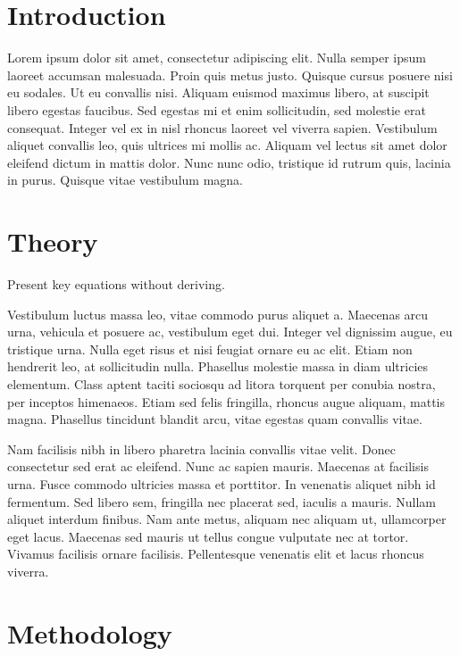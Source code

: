 \documentclass[a4paper,12pt,twocolumn]{article}
\begin{document}
\section{Introduction}
	Lorem ipsum dolor sit amet, consectetur adipiscing elit. Nulla semper ipsum laoreet accumsan malesuada. Proin quis metus justo. Quisque cursus posuere nisi eu sodales. Ut eu convallis nisi. Aliquam euismod maximus libero, at suscipit libero egestas faucibus. Sed egestas mi et enim sollicitudin, sed molestie erat consequat. Integer vel ex in nisl rhoncus laoreet vel viverra sapien. Vestibulum aliquet convallis leo, quis ultrices mi mollis ac. Aliquam vel lectus sit amet dolor eleifend dictum in mattis dolor. Nunc nunc odio, tristique id rutrum quis, lacinia in purus. Quisque vitae vestibulum magna.
	
\section{Theory}
	Present key equations without deriving.
	
	Vestibulum luctus massa leo, vitae commodo purus aliquet a. Maecenas arcu urna, vehicula et posuere ac, vestibulum eget dui. Integer vel dignissim augue, eu tristique urna. Nulla eget risus et nisi feugiat ornare eu ac elit. Etiam non hendrerit leo, at sollicitudin nulla. Phasellus molestie massa in diam ultricies elementum. Class aptent taciti sociosqu ad litora torquent per conubia nostra, per inceptos himenaeos. Etiam sed felis fringilla, rhoncus augue aliquam, mattis magna. Phasellus tincidunt blandit arcu, vitae egestas quam convallis vitae.
	
	Nam facilisis nibh in libero pharetra lacinia convallis vitae velit. Donec consectetur sed erat ac eleifend. Nunc ac sapien mauris. Maecenas at facilisis urna. Fusce commodo ultricies massa et porttitor. In venenatis aliquet nibh id fermentum. Sed libero sem, fringilla nec placerat sed, iaculis a mauris. Nullam aliquet interdum finibus. Nam ante metus, aliquam nec aliquam ut, ullamcorper eget lacus. Maecenas sed mauris ut tellus congue vulputate nec at tortor. Vivamus facilisis ornare facilisis. Pellentesque venenatis elit et lacus rhoncus viverra.
	
\section{Methodology}
	
\end{document}
